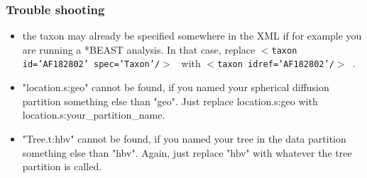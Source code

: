 \documentclass{article}
\begin{document}
\subsubsection*{Trouble shooting}
\begin{itemize}
\item the taxon may already be specified somewhere in the XML if for example you are running a *BEAST analysis. In that case, replace {\tt $<$taxon id='AF182802' spec='Taxon'/$>$ } with {\tt$<$taxon idref='AF182802'/$>$ }.
\item "location.s:geo" cannot be found, if you named your spherical diffusion partition something else than "geo". Just replace location.s:geo with location.s:your\_partition\_name.
\item "Tree.t:hbv" cannot be found, if you named your tree in the data partition something else than "hbv". Again, just replace "hbv" with whatever the tree partition is called.
\end{itemize}




\end{document}
